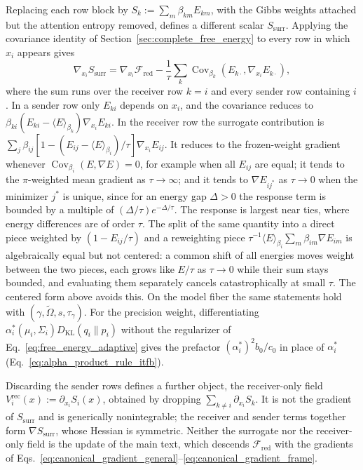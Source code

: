 Replacing each row block by $S_k := \sum_m \beta_{km}E_{km}$, with the Gibbs weights attached but the attention entropy removed, defines a different scalar $S_{\mathrm{surr}}$. Applying the covariance identity of Section~\ref{sec:complete_free_energy} to every row in which $x_i$ appears gives
\begin{equation}
\nabla_{x_i}S_{\mathrm{surr}} = \nabla_{x_i}\mathcal{F}_{\mathrm{red}} - \frac{1}{\tau}\sum_{k}\operatorname{Cov}_{\beta_k}\left(E_{k\cdot}, \nabla_{x_i}E_{k\cdot}\right),
\label{eq:surrogate_covariance_gap}
\end{equation}
where the sum runs over the receiver row $k = i$ and every sender row containing $i$. In a sender row only $E_{ki}$ depends on $x_i$, and the covariance reduces to $\beta_{ki}(E_{ki} - \langle E\rangle_{\beta_k})\nabla_{x_i}E_{ki}$. In the receiver row the surrogate contribution is $\sum_j \beta_{ij}[1 - (E_{ij} - \langle E\rangle_{\beta_i})/\tau]\nabla_{x_i}E_{ij}$. It reduces to the frozen-weight gradient whenever $\operatorname{Cov}_{\beta_i}(E, \nabla E) = 0$, for example when all $E_{ij}$ are equal; it tends to the $\pi$-weighted mean gradient as $\tau \to \infty$; and it tends to $\nabla E_{ij^*}$ as $\tau \to 0$ when the minimizer $j^*$ is unique, since for an energy gap $\Delta > 0$ the response term is bounded by a multiple of $(\Delta/\tau)e^{-\Delta/\tau}$. The response is largest near ties, where energy differences are of order $\tau$. The split of the same quantity into a direct piece weighted by $(1 - E_{ij}/\tau)$ and a reweighting piece $\tau^{-1}\langle E\rangle_{\beta_i}\sum_m\beta_{im}\nabla E_{im}$ is algebraically equal but not centered: a common shift of all energies moves weight between the two pieces, each grows like $E/\tau$ as $\tau \to 0$ while their sum stays bounded, and evaluating them separately cancels catastrophically at small $\tau$. The centered form above avoids this. On the model fiber the same statements hold with $(\gamma, \tilde\Omega, s, \tau_\gamma)$. For the precision weight, differentiating $\alpha_i^*(\mu_i,\Sigma_i)D_{\mathrm{KL}}(q_i\|p_i)$ without the regularizer of Eq.~\eqref{eq:free_energy_adaptive} gives the prefactor $(\alpha_i^*)^2 b_0/c_0$ in place of $\alpha_i^*$ (Eq.~\eqref{eq:alpha_product_rule_itfb}).

Discarding the sender rows defines a further object, the receiver-only field $V_i^{\mathrm{rec}}(x) := \partial_{x_i}S_{i}(x)$, obtained by dropping $\sum_{k \ne i}\partial_{x_i}S_{k}$. It is not the gradient of $S_{\mathrm{surr}}$ and is generically nonintegrable; the receiver and sender terms together form $\nabla S_{\mathrm{surr}}$, whose Hessian is symmetric. Neither the surrogate nor the receiver-only field is the update of the main text, which descends $\mathcal{F}_{\mathrm{red}}$ with the gradients of Eqs.~\eqref{eq:canonical_gradient_general}--\eqref{eq:canonical_gradient_frame}.


